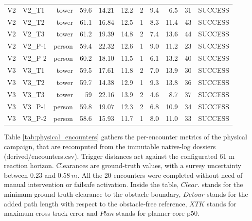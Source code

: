 \documentclass[electronics,article,submit,moreauthors]{Definitions/mdpi}
\DeclareRobustCommand{\added}[1]{#1}%
\DeclareRobustCommand{\added}[1]{\textcolor{green!50!black}{#1}}
\def\added#1{#1}%
\begin{document}
\begin{table}[H]
\begin{tabular}{llrrrrrrrrl}
\added{V2} & \added{V2\_T1} & \added{tower} & \added{59.6} & \added{14.21} & \added{12.2} & \added{2} & \added{9.4} & \added{6.5} & \added{31} & \added{SUCCESS} \\
\added{V2} & \added{V2\_T2} & \added{tower} & \added{61.1} & \added{16.84} & \added{12.5} & \added{1} & \added{8.3} & \added{11.4} & \added{43} & \added{SUCCESS} \\
\added{V2} & \added{V2\_T3} & \added{tower} & \added{61.2} & \added{19.39} & \added{14.8} & \added{2} & \added{7.4} & \added{13.6} & \added{44} & \added{SUCCESS} \\
\added{V2} & \added{V2\_P-1} & \added{person} & \added{59.4} & \added{22.32} & \added{12.6} & \added{1} & \added{9.0} & \added{11.2} & \added{23} & \added{SUCCESS} \\
\added{V2} & \added{V2\_P-2} & \added{person} & \added{60.2} & \added{18.10} & \added{11.5} & \added{1} & \added{6.1} & \added{13.2} & \added{40} & \added{SUCCESS} \\
\added{V3} & \added{V3\_T1} & \added{tower} & \added{59.5} & \added{17.61} & \added{11.8} & \added{2} & \added{7.0} & \added{13.9} & \added{30} & \added{SUCCESS} \\
\added{V3} & \added{V3\_T2} & \added{tower} & \added{59.7} & \added{14.38} & \added{12.9} & \added{1} & \added{9.3} & \added{13.8} & \added{36} & \added{SUCCESS} \\
\added{V3} & \added{V3\_T3} & \added{tower} & \added{59} & \added{22.16} & \added{13.9} & \added{2} & \added{4.6} & \added{8.7} & \added{37} & \added{SUCCESS} \\
\added{V3} & \added{V3\_P-1} & \added{person} & \added{59.8} & \added{19.07} & \added{12.3} & \added{2} & \added{6.8} & \added{10.9} & \added{34} & \added{SUCCESS} \\
\added{V3} & \added{V3\_P-2} & \added{person} & \added{58.6} & \added{15.93} & \added{11.7} & \added{1} & \added{8.0} & \added{11.0} & \added{33} & \added{SUCCESS} \\
\bottomrule
\end{tabular}
\end{table}

\added{Table \ref{tab:physical_encounters} gathers the per-encounter metrics of the physical campaign, that are recomputed from the immutable native-log dossiers (derived/encounters.csv). Trigger distances act against the configurated 61 m reaction horizon. Clearances are ground-truth values, with a survey uncertainty between $0.23$ and $0.58~m$. All the 20 encounters were completed without need of manual intervention or failsafe activation. Inside the table, $Clear. $ stands for the minimum ground-truth clearance to the obstacle boundary, $Detour$ stands for the added path length with respect to the obstacle-free reference, $XTK$ stands for maximum cross track error and $Plan$ stands for planner-core p50.}
\end{document}
